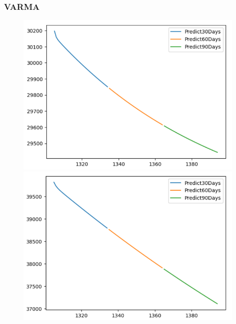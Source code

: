\subsubsection{VARMA}
\begin{figure}[H]
    \centering
    \begin{minipage}{0.15\textwidth}
    \centering
    \includegraphics[width=1\textwidth]{resources/chapter-5/newdata1/predicted/BIDV_VARMA_7-3_30days.png}
    \end{minipage}
    \hfill
    \begin{minipage}{0.15\textwidth}
    \centering
    \includegraphics[width=1\textwidth]{resources/chapter-5/newdata1/predicted/BIDV_VARMA_8-2_30days.png}
    \end{minipage}
    \hfill
        \begin{minipage}{0.15\textwidth}

\end{minipage}
\end{figure}
